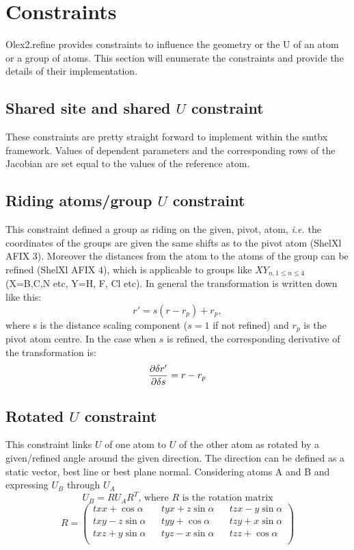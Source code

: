 \documentclass[pdf]{iucr}
\begin{document}
\section{Constraints}
Olex2.refine provides constraints to influence the geometry or the U of an atom or a group of atoms. This section will enumerate the constraints and provide the details of their implementation.

\subsection{Shared site and shared $U$ constraint}
These constraints are pretty straight forward to implement within the smtbx framework. Values of dependent parameters and the corresponding rows of the Jacobian are set equal to the values of the reference atom.

\subsection{Riding atoms/group $U$ constraint}
This constraint defined a group as riding on the given, pivot, atom, \emph{i.e.} the coordinates of the groups are given the same shifts as to the pivot atom (ShelXl AFIX 3). Moreover the distances from the atom to the atoms of the group can be refined (ShelXl AFIX 4), which is applicable to groups like $XY_{n, 1\leq n \leq 4}$ (X=B,C,N etc, Y=H, F, Cl etc). In general the transformation is written down like this:
\begin{equation}
r' = s(r-r_{p}) + r_{p},
\end{equation}
where s is the distance scaling component ($s=1$ if not refined) and $r_{p}$ is the pivot atom centre. In the case when $s$ is refined, the corresponding derivative of the transformation is:
\begin{equation}
\frac{\partial \delta r'}{\partial \delta s} = r-r_{p}
\end{equation}


\subsection{Rotated $U$ constraint}
This constraint links $U$ of one atom to $U$ of the other atom as  rotated by a given/refined angle around the given direction. The direction can be defined as a static vector, best line or best plane normal. Considering atoms A and B and expressing $U_{B}$ through $U_{A}$
\begin{equation}
U_{B} = RU_{A}R^{T} \text{, where $R$ is the rotation matrix}
\end{equation}
\begin{equation}
R = 
  \begin{pmatrix} \label{eq:rm}
    txx + \cos\alpha && tyx + z\sin\alpha && tzx - y\sin\alpha \\
    txy - z\sin\alpha && tyy + \cos\alpha && tzy + x\sin\alpha \\
    txz + y\sin\alpha && tyz - x\sin\alpha && tzz + \cos\alpha \\
  \end{pmatrix}
\end{equation}
\end{document}
